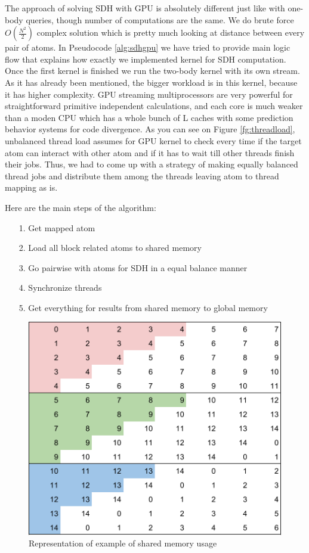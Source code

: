 \documentclass[11pt,a4paper]{report}
\begin{document}
The approach of solving SDH with GPU is absolutely different just like with one-body queries, though number of computations are the same. We do brute force  $O(\frac{N^2}{2})$ complex solution which is pretty much looking at distance between every pair of atoms. In Pseudocode \ref{alg:sdhgpu} we have tried to provide main logic flow that explains how exactly we implemented kernel for SDH computation. 
Once the first kernel is finished we run the two-body kernel with its own stream. As it has already been mentioned, the bigger workload is in this kernel, because it has higher complexity. GPU streaming multiprocessors are very powerful for straightforward primitive independent calculations, and each core is much weaker than a moden CPU which has a whole bunch of L caches with some prediction behavior systems for code divergence. As you can see on Figure \ref{fg:threadload}, unbalanced thread load assumes for GPU kernel to check every time if the target atom can interact with other atom and if it has to wait till other threads finish their jobs. Thus, we had to come up with a strategy of making equally balanced thread jobs and distribute them among the threads leaving atom to thread mapping as is. 

Here are the main steps of the algorithm:
\begin{itemize}
\item[1.] Get mapped atom
\item[2.] Load all block related atoms to shared memory
\item[3.] Go pairwise with atoms for SDH in a equal balance manner
\item[4.] Synchronize threads
\item[5.] Get everything for results from shared memory to global memory
\end{itemize}


\begin{figure}
 \centerline{ \includegraphics[width=0.5\columnwidth]{images/sharedMem}}
 \caption{Representation of example of shared memory usage}
 \label{fg:sharedMem}
\end{figure}
\end{document}
